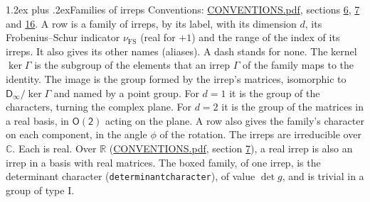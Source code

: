 \documentclass[10pt,a4paper]{article}
\makeatletter
\renewcommand\section{\@startsection{section}{1}{\z@}{-3ex plus -1ex minus -.2ex}%
  {1.2ex plus .2ex}{\normalfont\large\sffamily\bfseries\color{parttitle}}}
\numberwithin{equation}{section}
\newcommand{\grp}[1]{\mathsf{#1}}
\newcommand{\fsind}{\nu_{\mathrm{FS}}}
\makeatother
\begin{document}
\section{Families of irreps}\label{s:families}
Conventions: \href{../../CONVENTIONS.pdf}{CONVENTIONS.pdf}, sections \href{../../CONVENTIONS.pdf\#conv.6}{6}, \href{../../CONVENTIONS.pdf\#conv.7}{7} and \href{../../CONVENTIONS.pdf\#conv.16}{16}.
\leavevmode\label{n:index.dimension}\label{n:index.frobenius}\label{n:index.family}\label{n:head.family.irreps}\label{n:head.index.family}A row is a family of irreps, by its label, with its dimension $d$, its Frobenius--Schur indicator $\fsind$ (real for $+1$) and the range of the index of its irreps. \label{n:head.aliases}It also gives its other names (aliases). A dash stands for none. \label{n:irrep.Gamma}\label{n:head.kernel}The kernel $\ker\Gamma$ is the subgroup of the elements that an irrep $\Gamma$ of the family maps to the identity. \label{n:head.image}The image is the group formed by the irrep's matrices, isomorphic to $\grp{D_{\infty}}/\ker\Gamma$ and named by a point group. For $d = 1$ it is the group of the characters, turning the complex plane. For $d = 2$ it is the group of the matrices in a real basis, in $\grp{O(2)}$ acting on the plane. A row also gives the family's character on each component, in the angle $\phi$ of the rotation. The irreps are irreducible over $\mathbb{C}$. Each is real. Over $\mathbb{R}$ (\href{../../CONVENTIONS.pdf}{CONVENTIONS.pdf}, section \href{../../CONVENTIONS.pdf\#conv.7}{7}), a real irrep is also an irrep in a basis with real matrices. \label{n:mark.determinant}The boxed family, of one irrep, is the determinant character (\texttt{determinantcharacter}), of value $\det g$, and is trivial in a group of type I.
\end{document}
